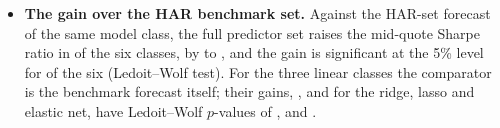 \begin{itemize}
\item \textbf{The gain over the HAR benchmark set.} Against the HAR-set forecast of the same model class, the full
  predictor set raises the mid-quote Sharpe ratio in \rhemFullVsHarPosWord{} of the six classes, by
  \rhrAfPoolDShMin{} to \rhrAfPoolDShMax, and the gain is significant at the 5\% level for \rhemFullVsHarSigWord{} of
  the six (Ledoit--Wolf test). For the three linear classes the comparator is the benchmark forecast itself; their
  gains, \rhemDShRidgeFullVsHar,
  \rhemDShLassoFullVsHar{} and \rhemDShEnetFullVsHar{} for the ridge, lasso and elastic net, have Ledoit--Wolf
  $p$-values of \rhemPDShRidgeFullVsHar, \rhemPDShLassoFullVsHar{} and \rhemPDShEnetFullVsHar.

\end{itemize}
